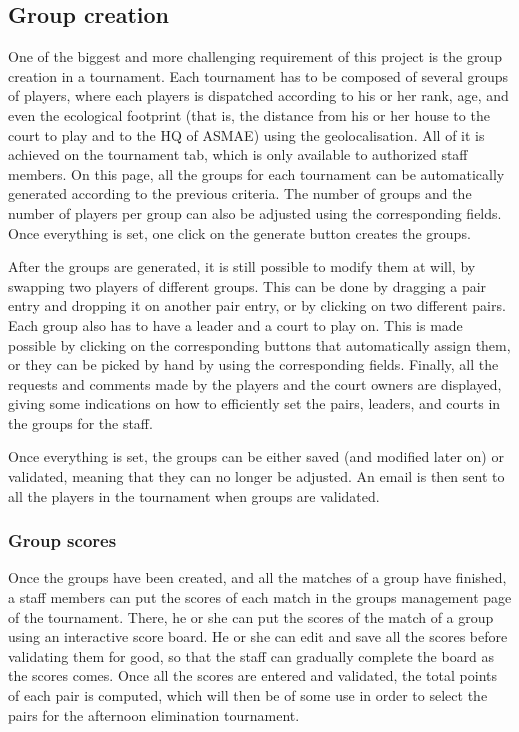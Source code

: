 \subsection{Group creation}
\label{sub:Group creation}


One of the biggest and more challenging requirement of this project is the
group creation in a tournament. Each tournament has to be composed of
several groups of players, where each players is dispatched according to
his or her rank, age, and even the ecological footprint (that is, the distance
from his or her house to the court to play and to the HQ of ASMAE)
using the geolocalisation. All of it is achieved on the tournament tab, which is
only available to authorized staff members. On this page, all the
groups for each tournament can be automatically generated according to the
previous criteria. The number of groups and the number of players per group
can also be adjusted using the corresponding fields. Once everything is set,
one click on the generate button creates the groups. \newline

After the groups are generated, it is still possible to modify them at will, by
swapping two players of different groups. This can be done by dragging a pair
entry and dropping it on another pair entry, or by clicking on two different
pairs. Each group also has to have a leader and a court to play on.
This is made possible by clicking on the corresponding buttons that
automatically assign them, or they can be picked by hand by using the
corresponding fields. Finally, all the requests and comments made by the
players and the court owners are displayed, giving some indications on how
to efficiently set the pairs, leaders, and courts in the groups for the staff.
\newline

Once everything is set, the groups can be either saved (and modified later on)
or validated, meaning that they can no longer be adjusted. An email is then
sent to all the players in the tournament when groups are validated.

\subsubsection{Group scores}
\label{subs:Group scores}


Once the groups have been created, and all the matches of a group have
finished, a staff members can put the scores of each match in the groups
management page of the tournament. There, he or she can put the scores of the
match of a group using an interactive score board. He or she can edit and save
all the scores before validating them for good, so that the staff can gradually
complete the board as the scores comes. Once all the scores are entered and
validated, the total points of each pair is computed, which will then be of
some use in order to select the pairs for the afternoon elimination tournament.
\newline

